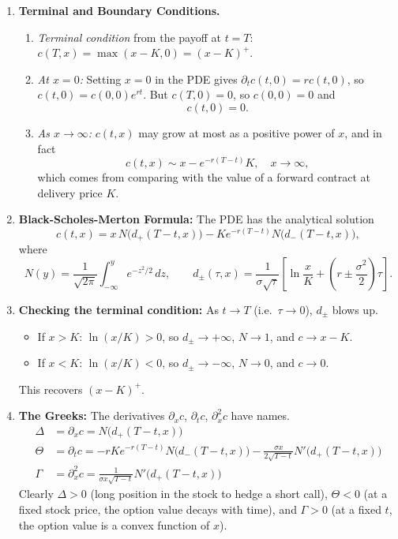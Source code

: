 \begin{enumerate}
    \item \textbf{Terminal and Boundary Conditions.}
    \begin{enumerate}
        \item \textit{Terminal condition} from the payoff at $t = T$: $c(T, x) = \max(x - K, 0) = (x - K)^+$.
        \item \textit{At $x = 0$:} Setting $x = 0$ in the PDE gives $\partial_t c(t, 0) = r c(t, 0)$, so $c(t, 0) = c(0, 0)e^{rt}$. But $c(T, 0) = 0$, so $c(0,0) = 0$ and
        \[c(t, 0) = 0.\]
        \item \textit{As $x \to \infty$:} $c(t, x)$ may grow at most as a positive power of $x$, and in fact
        \[c(t, x) \sim x - e^{-r(T-t)}K, \quad x \to \infty,\]
        which comes from comparing with the value of a forward contract at delivery price $K$.
    \end{enumerate}

    \item \textbf{Black-Scholes-Merton Formula:} The PDE has the analytical solution
    \[c(t, x) = x\, N\bigl(d_+(T-t, x)\bigr) - K e^{-r(T-t)} N\bigl(d_-(T-t, x)\bigr),\]
    where
    \[N(y) = \frac{1}{\sqrt{2\pi}}\int_{-\infty}^{y} e^{-z^2/2}\, dz, \qquad d_\pm(\tau, x) = \frac{1}{\sigma\sqrt{\tau}}\left[\ln\frac{x}{K} + \left(r \pm \frac{\sigma^2}{2}\right)\tau\right].\]

    \item \textbf{Checking the terminal condition:} As $t \to T$ (i.e.\ $\tau \to 0$), $d_\pm$ blows up.
    \begin{itemize}
        \item If $x > K$: $\ln(x/K) > 0$, so $d_\pm \to +\infty$, $N \to 1$, and $c \to x - K$.
        \item If $x < K$: $\ln(x/K) < 0$, so $d_\pm \to -\infty$, $N \to 0$, and $c \to 0$.
    \end{itemize}
    This recovers $(x - K)^+$.

    \item \textbf{The Greeks:} The derivatives $\partial_x c$, $\partial_t c$, $\partial_x^2 c$ have names.
    \begin{align*}
        \Delta &= \partial_x c = N\bigl(d_+(T-t, x)\bigr) \\
        \Theta &= \partial_t c = -rKe^{-r(T-t)}N\bigl(d_-(T-t, x)\bigr) - \frac{\sigma x}{2\sqrt{T-t}}N'\bigl(d_+(T-t, x)\bigr) \\
        \Gamma &= \partial_x^2 c = \frac{1}{\sigma x\sqrt{T-t}}N'\bigl(d_+(T-t, x)\bigr)
    \end{align*}
    Clearly $\Delta > 0$ (long position in the stock to hedge a short call), $\Theta < 0$ (at a fixed stock price, the option value decays with time), and $\Gamma > 0$ (at a fixed $t$, the option value is a convex function of $x$).


\end{enumerate}
